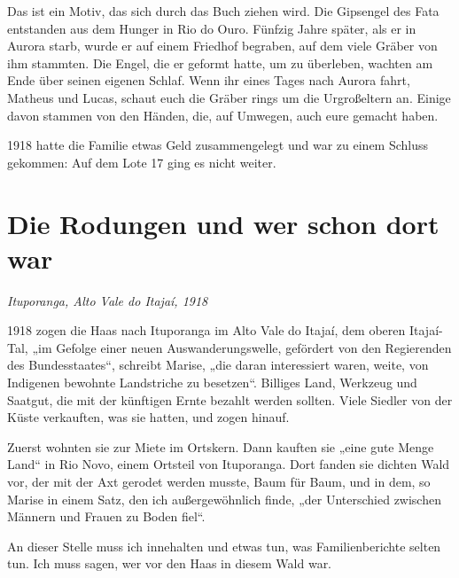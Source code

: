 \documentclass[
  ngerman,
  11pt,
  openany]{book}
\begin{document}
Das ist ein Motiv, das sich durch das Buch ziehen wird. Die Gipsengel
des Fata entstanden aus dem Hunger in Rio do Ouro. Fünfzig Jahre später,
als er in Aurora starb, wurde er auf einem Friedhof begraben, auf dem
viele Gräber von ihm stammten. Die Engel, die er geformt hatte, um zu
überleben, wachten am Ende über seinen eigenen Schlaf. Wenn ihr eines
Tages nach Aurora fahrt, Matheus und Lucas, schaut euch die Gräber rings
um die Urgroßeltern an. Einige davon stammen von den Händen, die, auf
Umwegen, auch eure gemacht haben.

1918 hatte die Familie etwas Geld zusammengelegt und war zu einem
Schluss gekommen: Auf dem Lote 17 ging es nicht weiter.

\section{Die Rodungen und wer schon dort
war}\label{die-rodungen-und-wer-schon-dort-war}

\emph{Ituporanga, Alto Vale do Itajaí, 1918}

1918 zogen die Haas nach Ituporanga im Alto Vale do Itajaí, dem oberen
Itajaí-Tal, „im Gefolge einer neuen Auswanderungswelle, gefördert von
den Regierenden des Bundesstaates``, schreibt Marise, „die daran
interessiert waren, weite, von Indigenen bewohnte Landstriche zu
besetzen``. Billiges Land, Werkzeug und Saatgut, die mit der künftigen
Ernte bezahlt werden sollten. Viele Siedler von der Küste verkauften,
was sie hatten, und zogen hinauf.

Zuerst wohnten sie zur Miete im Ortskern. Dann kauften sie „eine gute
Menge Land`` in Rio Novo, einem Ortsteil von Ituporanga. Dort fanden sie
dichten Wald vor, der mit der Axt gerodet werden musste, Baum für Baum,
und in dem, so Marise in einem Satz, den ich außergewöhnlich finde, „der
Unterschied zwischen Männern und Frauen zu Boden fiel``.

An dieser Stelle muss ich innehalten und etwas tun, was Familienberichte
selten tun. Ich muss sagen, wer vor den Haas in diesem Wald war.
\end{document}

